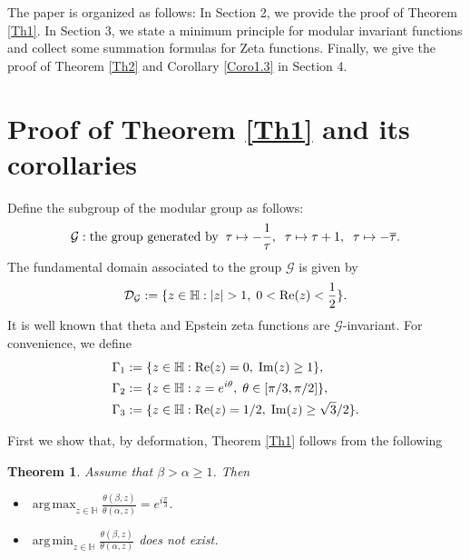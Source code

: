 \documentclass[reqno,english]{amsart}
\newtheorem{open problem}{Open Problem}[section]
\newtheorem{open question}{Open Question}[section]
\newtheorem{open questions on hexagonal lattice}{Open Questions on hexagonal lattice}[section]
\newtheorem{theorem}{Theorem}[section]
\renewcommand{\Re}{\operatorname{Re}}
\renewcommand{\Im}{\operatorname{Im}}
\DeclareMathOperator*{\argmax}{arg\,max}
\DeclareMathOperator*{\argmin}{arg\,min}
\begin{document}
\vskip0.1in


The paper is organized as follows: In Section 2, we provide the proof of Theorem \ref{Th1}.
In Section 3, we state a minimum principle for modular invariant functions and collect some summation formulas for Zeta functions.
Finally, we give the proof of Theorem \ref{Th2} and Corollary \ref{Coro1.3} in Section 4.

\section{Proof of Theorem \ref{Th1} and its corollaries}
\setcounter{equation}{0}
Define the subgroup of the modular group as follows:
\begin{equation}\aligned\label{GroupG1}
\mathcal{G}: \hbox{the group generated by} \;\;\tau\mapsto -\frac{1}{\tau},\;\; \tau\mapsto \tau+1,\;\;\tau\mapsto -\overline{\tau}.
\endaligned\end{equation}
The fundamental domain associated to the group $\mathcal{G}$ is given by
\begin{equation}\aligned\nonumber
\mathcal{D}_{\mathcal{G}}:=\{
z\in\mathbb{H}: |z|>1,\; 0<\Re(z)<\frac{1}{2}
\}.
\endaligned\end{equation}
It is well known that theta and Epstein zeta functions are $\mathcal{G}$-invariant.
For convenience, we define
\begin{equation}\aligned\label{Gfff}
&\Gamma_1:=\{
z\in\mathbb{H}: \Re(z)=0,\; \Im(z)\geq1
\},\\
&\Gamma_2:=\{
z\in\mathbb{H}: z=e^{i\theta},\; \theta\in[\pi/3,\pi/2]
\},\\
&\Gamma_3:=\{
z\in\mathbb{H}: \Re(z)=1/2,\; \Im(z)\geq{\sqrt3}/{2}
\}.
\endaligned\end{equation}


First we show that, by deformation, Theorem \ref{Th1} follows from the following
\begin{theorem}\label{Th12} Assume that $\beta>\alpha\geq1$. Then
\begin{itemize}
  \item  [(1)] $
\argmax_{z\in\mathbb{H}}\frac{\theta(\beta,z)}{\theta(\alpha,z)}=e^{i\frac{\pi}{3}}$.

  \item [(2)]  $\argmin_{z\in\mathbb{H}}\frac{\theta(\beta,z)}{\theta(\alpha,z)}$ does not exist.
 \end{itemize}
\end{theorem}
\end{document}
